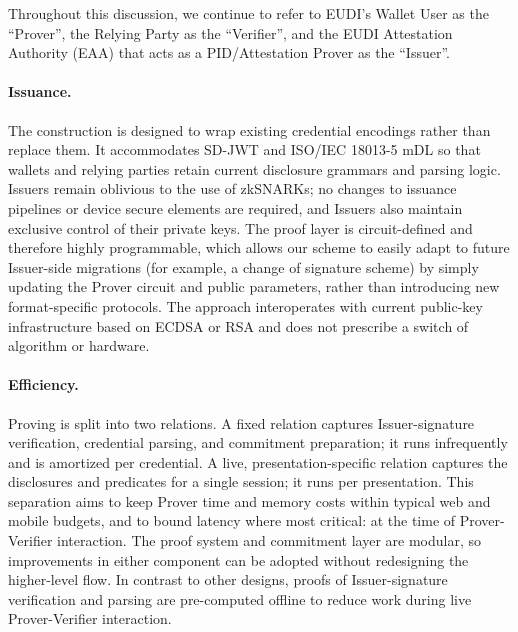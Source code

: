 Throughout this discussion, we continue to refer to EUDI's Wallet User as the ``Prover'', the Relying Party as the ``Verifier'', and the EUDI Attestation Authority (EAA) that acts as a PID/Attestation Prover as the ``Issuer''.


\paragraph{Issuance.}
The construction is designed to wrap existing credential encodings rather than replace them. 
It accommodates SD-JWT and ISO/IEC 18013-5 mDL so that wallets and relying parties retain current disclosure grammars and parsing logic. 
Issuers remain oblivious to the use of zkSNARKs; no changes to issuance pipelines or device secure elements are required, and Issuers also maintain exclusive control of their private keys. 
The proof layer is circuit-defined and therefore highly programmable, which allows our scheme to easily adapt to future Issuer-side migrations (for example, a change of signature scheme) by simply updating the Prover circuit and public parameters, rather than introducing new format-specific protocols. 
The approach interoperates with current public-key infrastructure based on ECDSA or RSA and does not prescribe a switch of algorithm or hardware.

\paragraph{Efficiency.}
Proving is split into two relations. A fixed relation captures Issuer-signature verification, credential parsing, and commitment preparation; it runs infrequently and is amortized per credential. 
A live, presentation-specific relation captures the disclosures and predicates for a single session; it runs per presentation. 
This separation aims to keep Prover time and memory costs within typical web and mobile budgets, and to bound latency where most critical: at the time of Prover-Verifier interaction. 
The proof system and commitment layer are modular, so improvements in either component can be adopted without redesigning the higher-level flow. 
In contrast to other designs, proofs of Issuer-signature verification and parsing are pre-computed offline to reduce work during live Prover-Verifier interaction.

